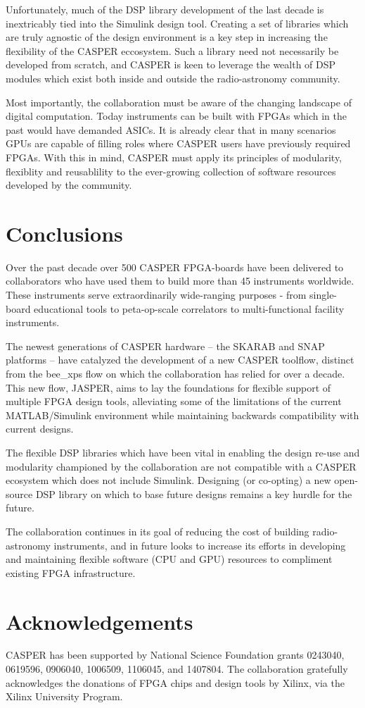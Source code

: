 \documentclass{ws-jai}
\begin{document}
Unfortunately, much of the DSP library development of the last decade is inextricably tied into the Simulink design tool. Creating a set of libraries which are truly agnostic of the design environment is a key step in increasing the flexibility of the CASPER eccosystem. Such a library need not necessarily be developed from scratch, and CASPER is keen to leverage the wealth of DSP modules which exist both inside and outside the radio-astronomy community.

Most importantly, the collaboration must be aware of the changing landscape of digital computation. Today instruments can be built with FPGAs which in the past would have demanded ASICs. It is already clear that in many scenarios GPUs are capable of filling roles where CASPER users have previously required FPGAs. With this in mind, CASPER must apply its principles of modularity, flexiblity and reusablility to the ever-growing collection of software resources developed by the community.

\section{Conclusions} \label{sec:Conclusions}
Over the past decade over 500 CASPER FPGA-boards have been delivered to collaborators who have used them to build more than 45 instruments worldwide. These instruments serve extraordinarily wide-ranging purposes - from single-board educational tools to peta-op-scale correlators to multi-functional facility instruments.

The newest generations of CASPER hardware -- the SKARAB and SNAP platforms -- have catalyzed the development of a new CASPER toolflow, distinct from the bee\_xps flow on which the collaboration has relied for over a decade. This new flow, JASPER, aims to lay the foundations for flexible support of multiple FPGA design tools, alleviating some of the limitations of the current MATLAB/Simulink environment while maintaining backwards compatibility with current designs.

The flexible DSP libraries which have been vital in enabling the design re-use and modularity championed by the collaboration are not compatible with a CASPER ecosystem which does not include Simulink. Designing (or co-opting) a new open-source DSP library on which to base future designs remains a key hurdle for the future.

The collaboration continues in its goal of reducing the cost of building radio-astronomy instruments, and in future looks to increase its efforts in developing and maintaining flexible software (CPU and GPU) resources to compliment existing FPGA infrastructure.

\section{Acknowledgements}
CASPER has been supported by National Science Foundation grants 0243040,  0619596,  0906040,  1006509,  1106045, and 1407804. The collaboration gratefully acknowledges the donations of FPGA chips and design tools by Xilinx, via the Xilinx University Program.





\end{document}
